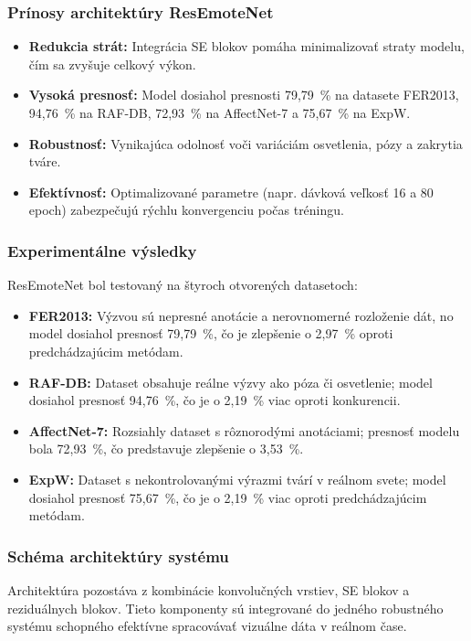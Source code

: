 \subsubsection{Prínosy architektúry ResEmoteNet}

\begin{itemize}
    \item \textbf{Redukcia strát:} Integrácia SE blokov pomáha minimalizovať straty modelu, čím sa zvyšuje celkový výkon.
    \item \textbf{Vysoká presnosť:} Model dosiahol presnosti 79,79~\% na datasete FER2013, 94,76~\% na RAF-DB, 72,93~\% na AffectNet-7 a 75,67~\% na ExpW.
    \item \textbf{Robustnosť:} Vynikajúca odolnosť voči variáciám osvetlenia, pózy a zakrytia tváre.
    \item \textbf{Efektívnosť:} Optimalizované parametre (napr. dávková veľkosť 16 a 80 epoch) zabezpečujú rýchlu konvergenciu počas tréningu.
\end{itemize}

\subsubsection{Experimentálne výsledky}

ResEmoteNet bol testovaný na štyroch otvorených datasetoch:
\begin{itemize}
    \item \textbf{FER2013:} Výzvou sú nepresné anotácie a nerovnomerné rozloženie dát, no model dosiahol presnosť 79,79~\%, čo je zlepšenie o 2,97~\% oproti predchádzajúcim metódam.
    \item \textbf{RAF-DB:} Dataset obsahuje reálne výzvy ako póza či osvetlenie; model dosiahol presnosť 94,76~\%, čo je o 2,19~\% viac oproti konkurencii.
    \item \textbf{AffectNet-7:} Rozsiahly dataset s rôznorodými anotáciami; presnosť modelu bola 72,93~\%, čo predstavuje zlepšenie o 3,53~\%.
    \item \textbf{ExpW:} Dataset s nekontrolovanými výrazmi tvárí v reálnom svete; model dosiahol presnosť 75,67~\%, čo je o 2,19~\% viac oproti predchádzajúcim metódam.
\end{itemize}

\subsubsection{Schéma architektúry systému}

Architektúra pozostáva z kombinácie konvolučných vrstiev, SE blokov a reziduálnych blokov. Tieto komponenty sú integrované do jedného robustného systému schopného efektívne spracovávať vizuálne dáta v reálnom čase.

